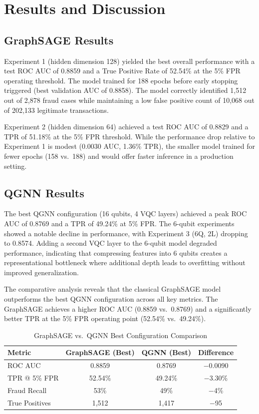 \section{Results and Discussion}

\subsection{GraphSAGE Results}

Experiment 1 (hidden dimension 128) yielded the best overall performance with a test ROC AUC of 0.8859 and a True Positive Rate of 52.54\% at the 5\% FPR operating threshold. The model trained for 188 epochs before early stopping triggered (best validation AUC of 0.8858). The model correctly identified 1,512 out of 2,878 fraud cases while maintaining a low false positive count of 10,068 out of 202,133 legitimate transactions.

Experiment 2 (hidden dimension 64) achieved a test ROC AUC of 0.8829 and a TPR of 51.18\% at the 5\% FPR threshold. While the performance drop relative to Experiment 1 is modest (0.0030 AUC, 1.36\% TPR), the smaller model trained for fewer epochs (158 vs.\ 188) and would offer faster inference in a production setting.

\subsection{QGNN Results}

The best QGNN configuration (16 qubits, 4 VQC layers) achieved a peak ROC AUC of 0.8769 and a TPR of 49.24\% at 5\% FPR. The 6-qubit experiments showed a notable decline in performance, with Experiment 3 (6Q, 2L) dropping to 0.8574. Adding a second VQC layer to the 6-qubit model degraded performance, indicating that compressing features into 6 qubits creates a representational bottleneck where additional depth leads to overfitting without improved generalization.

The comparative analysis reveals that the classical GraphSAGE model outperforms the best QGNN configuration across all key metrics. The GraphSAGE achieves a higher ROC AUC (0.8859 vs.\ 0.8769) and a significantly better TPR at the 5\% FPR operating point (52.54\% vs.\ 49.24\%).

\begin{table}[H]
\centering
\tablestrut
\caption{GraphSAGE vs.\ QGNN Best Configuration Comparison}
\label{tab:gnn-sage-vs-qgnn}
\small
\begin{tabularx}{\textwidth}{Xccc}
\toprule
\textbf{Metric} & \textbf{GraphSAGE (Best)} & \textbf{QGNN (Best)} & \textbf{Difference} \\
\midrule
ROC AUC         & 0.8859  & 0.8769  & $-$0.0090 \\
TPR @ 5\% FPR   & 52.54\% & 49.24\% & $-$3.30\% \\
Fraud Recall    & 53\%    & 49\%    & $-$4\% \\
True Positives  & 1,512   & 1,417   & $-$95 \\
\bottomrule
\end{tabularx}
\end{table}

